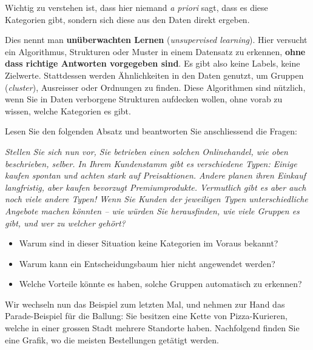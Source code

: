 \begin{lpu}
Wichtig zu verstehen ist, dass hier niemand \textit{a priori} sagt, dass es diese Kategorien gibt, sondern sich diese aus den Daten direkt ergeben. 

\begin{theorie}
Dies nennt man \textbf{unüberwachten Lernen} (\emph{unsupervised learning}). Hier versucht ein Algorithmus, Strukturen oder Muster in einem Datensatz zu erkennen, \textbf{ohne dass richtige Antworten vorgegeben sind}. Es gibt also keine Labels, keine Zielwerte. Stattdessen werden Ähnlichkeiten in den Daten genutzt, um Gruppen (\textit{cluster}), Ausreisser oder Ordnungen zu finden. Diese Algorithmen sind nützlich, wenn Sie in Daten verborgene Strukturen aufdecken wollen, ohne vorab zu wissen, welche Kategorien es gibt.
\end{theorie} 


\begin{aufgabe}{1}
Lesen Sie den folgenden Absatz und beantworten Sie anschliessend die Fragen:

\emph{Stellen Sie sich nun vor, Sie betrieben einen solchen Onlinehandel, wie oben beschrieben, selber. In Ihrem Kundenstamm gibt es verschiedene Typen: Einige kaufen spontan und achten stark auf Preisaktionen. Andere planen ihren Einkauf langfristig, aber kaufen bevorzugt Premiumprodukte. Vermutlich gibt es aber auch noch viele andere Typen! Wenn Sie Kunden der jeweiligen Typen unterschiedliche Angebote machen könnten – wie würden Sie herausfinden, wie viele Gruppen es gibt, und wer zu welcher gehört?}

\begin{itemize}
  \item Warum sind in dieser Situation keine Kategorien im Voraus bekannt?
  \item Warum kann ein Entscheidungsbaum hier nicht angewendet werden?
  \item Welche Vorteile könnte es haben, solche Gruppen automatisch zu erkennen?
\end{itemize}
\end{aufgabe}

Wir wechseln nun das Beispiel zum letzten Mal, und nehmen zur Hand das Parade-Beispiel für die Ballung: Sie besitzen eine Kette von Pizza-Kurieren, welche in einer grossen Stadt mehrere Standorte haben. Nachfolgend finden Sie eine Grafik, wo die meisten Bestellungen getätigt werden. 

\begin{figure}[h]
\centering
{}
\end{figure}
\end{lpu}
